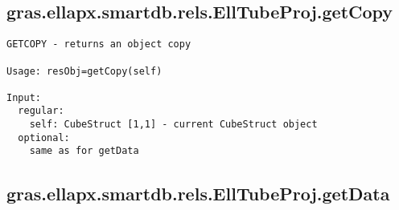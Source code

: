 \subsection{\texorpdfstring{gras.ellapx.smartdb.rels.EllTubeProj.getCopy}{getCopy}}\label{method:gras.ellapx.smartdb.rels.EllTubeProj.getCopy}
\begin{verbatim}
GETCOPY - returns an object copy

Usage: resObj=getCopy(self)

Input:
  regular:
    self: CubeStruct [1,1] - current CubeStruct object
  optional:
    same as for getData
\end{verbatim}
\subsection{\texorpdfstring{gras.ellapx.smartdb.rels.EllTubeProj.getData}{getData}}\label{method:gras.ellapx.smartdb.rels.EllTubeProj.getData}
